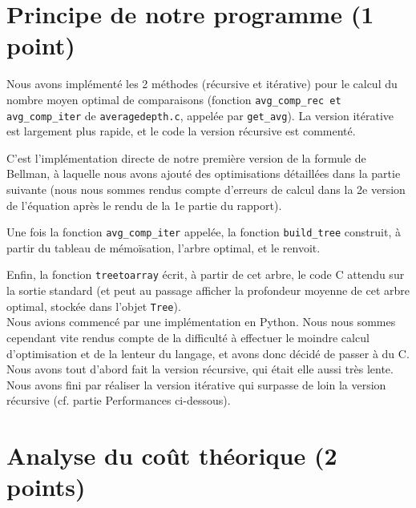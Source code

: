 \documentclass[a4paper, 10pt, french]{article}
\begin{document}
\section{Principe de notre  programme (1 point)}
{Nous avons implémenté les 2 méthodes (récursive et itérative) pour le calcul du nombre moyen optimal de comparaisons (fonction \verb?avg_comp_rec et avg_comp_iter? de \verb?averagedepth.c?, appelée par \verb?get_avg?). La version itérative est largement plus rapide, et le code la version récursive est commenté.

	C'est l'implémentation directe de notre première version de la formule de Bellman, à laquelle nous avons ajouté des optimisations détaillées dans la partie suivante (nous nous sommes rendus compte d'erreurs de calcul dans la 2e version de l'équation après le rendu de la 1e partie du rapport).

Une fois la fonction \verb?avg_comp_iter? appelée, la fonction \verb?build_tree? construit, à partir du tableau de mémoïsation, l'arbre optimal, et le renvoit.

Enfin, la fonction \verb?treetoarray? écrit, à partir de cet arbre, le code C attendu sur la sortie standard (et peut au passage afficher la profondeur moyenne de cet arbre optimal, stockée dans l'objet \verb?Tree?).\\


Nous avions commencé par une implémentation en Python. Nous nous sommes cependant vite rendus compte de la difficulté à effectuer le moindre calcul d'optimisation et de la lenteur du langage, et avons donc décidé de passer à du C.
Nous avons tout d'abord fait la version récursive, qui était elle aussi très lente. Nous avons fini par réaliser la version itérative qui surpasse de loin la version récursive (cf. partie Performances ci-dessous).
} 

\section{Analyse du coût théorique (2 points)}
\end{document}
